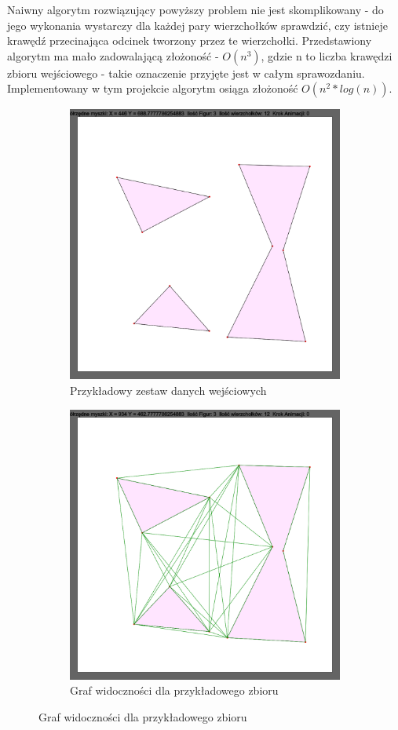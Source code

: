\documentclass{article}
\begin{document}
\noindent \qquad Naiwny algorytm rozwiązujący powyższy problem nie jest skomplikowany - do jego wykonania wystarczy dla każdej pary wierzchołków sprawdzić, czy istnieje krawędź przecinająca odcinek tworzony przez te wierzchołki. Przedstawiony algorytm ma mało zadowalającą złożoność - $O(n^3)$, gdzie n to liczba krawędzi zbioru wejściowego - takie oznaczenie przyjęte jest w całym sprawozdaniu. Implementowany w tym projekcie algorytm osiąga złożoność $O(n^2*log(n))$.

\begin{figure}[ht]
\caption{}
\centering
\begin{subfigure}{.5\textwidth}
\centering
\caption{Przykładowy zestaw danych wejściowych}
\includegraphics[width=.75\linewidth]{rys1a.png}
\end{subfigure}%
\begin{subfigure}{.5\textwidth}
\centering
\caption{Graf widoczności dla przykładowego zbioru}
\includegraphics[width=.75\linewidth]{rys1b.png}
\end{subfigure}%
\end{figure}
\end{document}

